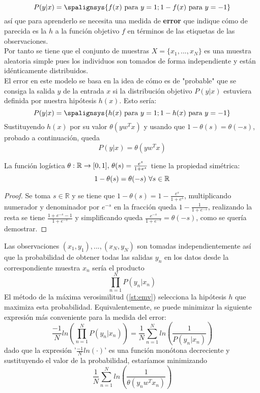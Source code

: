 \[P(y \vert x)=\spalignsys{
f(x) \textnormal{      para }  y=1;
1-f(x) \textnormal{   para }  y=-1}\]
así que para aprenderlo se necesita una medida de \textbf{error} que indique cómo de parecida es la $h$ a la función objetivo $f$ en términos de las etiquetas de las observaciones.\cite{abu2012learning}\\
Por tanto se tiene que el conjunto de muestras $X=\lbrace x_{1},...,x_{N} \rbrace$ es una muestra aleatoria simple pues los individuos son tomados de forma independiente y están idénticamente distribuidos.\\
El error en este modelo se basa en la idea de cómo es de "probable" que se consiga la salida $y$ de la entrada $x$ si la distribución objetivo $P(y \vert x)$ estuviera definida por nuestra hipótesis $h(x)$. Esto sería:
\[P(y \vert x)=\spalignsys{
h(x) \textnormal{      para }  y=1;
1-h(x) \textnormal{   para }  y=-1}\]
Sustituyendo $h(x)$ por su valor $\theta(yw^{T}x)$ y usando que $1-\theta(s)=\theta(-s)$, probado a continuación, queda \[ P(y \vert x)=\theta(yw^{T}x) \]
\begin{proposicion}La función logística $\theta: \mathbb{R} \rightarrow [0,1] \textnormal{, } \theta(s)=\frac{e^{s}}{1+e^{s}}$ tiene la propiedad simétrica: \[1-\theta(s)=\theta(-s) \textnormal{ } \forall s \in \mathbb{R} \]
\end{proposicion}
\begin{proof}
Se toma $s \in \mathbb{R}$ y se tiene que $1-\theta(s)=1-\frac{e^{s}}{1+e^{s}}$, multiplicando numerador y denominador por $e^{-s}$ en la fracción queda $1-\frac{1}{1+e^{-s}}$, realizando la resta se tiene $\frac{1+e^{-s}-1}{1+e^{-s}}$ y simplificando queda $\frac{e^{-s}}{1+e^{-s}}=\theta(-s)$, como se quería demostrar.
\end{proof}
Las observaciones $(x_{1},y_{1}),...,(x_{N},y_{N})$ son tomadas independientemente así que la probabilidad de obtener todas las salidas $y_{n}$ en los datos desde la correspondiente muestra $x_{n}$ sería el producto \[ \prod_{n=1}^{N}P(y_{n} \vert x_{n}) \]
El método de la máxima verosimilitud (\autoref{st:emv}) selecciona la hipótesis $h$ que maximiza esta probabilidad. Equivalentemente, se puede minimizar la siguiente expresión más conveniente para la medida del error:
\[ \frac{-1}{N}ln \left(\prod_{n=1}^{N}P(y_{n} \vert x_{n})\right) = \frac{1}{N}\sum_{n=1}^{N}ln \left(\frac{1}{P(y_{n} \vert x_{n})} \right) \]
dado que la expresión '$\frac{-1}{N}ln(\cdot)$' es una función monótona decreciente y sustituyendo el valor de la probabilidad, estaríamos minimizando
\[ \frac{1}{N}\sum_{n=1}^{N}ln \left(\frac{1}{\theta(y_{n}w^{T}x_{n})} \right) \]
